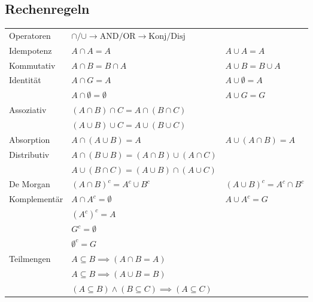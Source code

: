 \documentclass[8pt,landscape]{scrartcl}
\begin{document}
\begin{multicols}{3}
\subsection{Rechenregeln}
\begin{small}
\begin{tabular}{lll}
Operatoren    & $\cap/\cup \to \text{AND/OR} \to \text{Konj/Disj}$ &                  \\
Idempotenz    & $A \cap A = A$                          & $A \cup A = A$              \\
Kommutativ    & $A \cap B = B \cap A$                   & $A \cup B = B \cup A$       \\
Identit\"at   & $A \cap G = A$                          & $A \cup \emptyset = A$      \\
              & $A \cap \emptyset = \emptyset$          & $A \cup G = G$              \\
Assoziativ    & $(A \cap B) \cap C = A \cap (B \cap C)$ &                             \\
              & $(A \cup B) \cup C = A \cup (B \cup C)$ &                             \\
Absorption    & $A \cap (A \cup B) = A$                 & $A \cup (A \cap B) = A$     \\
Distributiv   & $A \cap (B \cup B) = (A \cap B) \cup (A \cap C)$ &                    \\
              & $A \cup (B \cap C) = (A \cup B) \cap (A \cup C)$                      \\
De Morgan     & $(A \cap B)^c = A^c \cup B^c$           & $(A \cup B)^c = A^c \cap B^c$ \\
Komplement\"ar& $A \cap A^c= \emptyset$                   & $A \cup A^c = G$            \\
              & $(A^c)^c = A$                           &                             \\
              & $G^c = \emptyset$                       &                             \\
              & $\emptyset^c = G$                       &                             \\
Teilmengen    & $A \subseteq B \implies (A \cap B = A)$ &                             \\
              & $A \subseteq B \implies (A \cup B = B)$ &                             \\
              & $(A \subseteq B ) \land (B \subseteq C) \implies (A \subseteq C)$ &   \\
\end{tabular}
\end{small}


\end{multicols}
\end{document}
